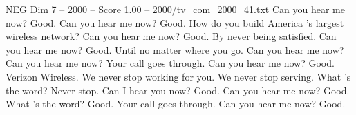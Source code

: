 \begin{textsample}{NEG Dim 7 – 2000 – Score 1.00 – 2000/tv\_com\_2000\_41.txt}  \label{ex:f7_neg_041}
Can you hear me now?
Good.
Can you hear me now?
Good.
How do you build America 's largest wireless network?
Can you hear me now?
Good.
By never being satisfied.
Can you hear me now?
Good.
Until no matter where you go.
Can you hear me now?
Can you hear me now?
Your call goes through.
Can you hear me now?
Good.
Verizon Wireless.
We never stop working for you.
We never stop serving.
What 's the word?
Never stop.
Can I hear you now?
Good.
Can you hear me now?
Good.
What 's the word?
Good.
Your call goes through.
Can you hear me now?
Good.

\end{textsample}
